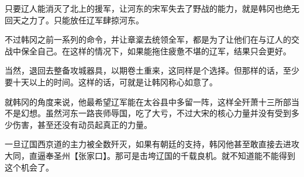 只要辽人能消灭了北上的援军，让河东的宋军失去了野战的能力，就是韩冈也绝无回天之力了。只能放任辽军肆掠河东。

不过韩冈之前一系列的命令，并让章楶去统领全军，都是为了让他们在与辽人的交战中保全自己。在这样的情况下，如果能拖住疲惫不堪的辽军，结果只会更好。

当然，退回去整备攻城器具，以期卷土重来，这同样是个选择。但那样的话，至少要十天以上的时间。这样的话，可就是让韩冈称心如意了。

就韩冈的角度来说，他最希望辽军能在太谷县中多留一阵，这样全歼萧十三所部当不是幻想。虽然河东一路丧师辱国，吃了大亏，不过大宋的核心力量并没有受到多少伤害，甚至还没有动员起真正的力量。

一旦辽国西京道的主力被全数歼灭，如果有朝廷的支持，韩冈他甚至敢直接去进攻大同，直逼奉圣州【张家口】。那可是击垮辽国的千载良机。就不知道能不能得到这个机会了。

